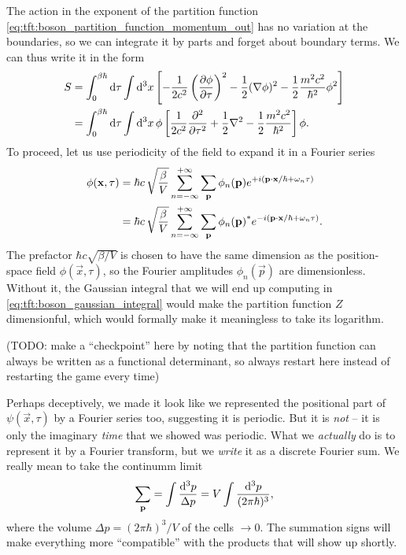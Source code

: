 The action in the exponent of the partition function \eqref{eq:tft:boson_partition_function_momentum_out} has no variation at the boundaries, so we can integrate it by parts and forget about boundary terms.
We can thus write it in the form
\begin{equation}
\begin{split}
	S & = \int_0^{\beta \hbar} \mathop{}\!\mathrm{d} \tau \int \mathop{}\!\mathrm{d}^3 x \left[ - \frac{1}{2c^2} \pdv{\phi}{\tau}^2 - \frac12 (\nabla \phi)^2 - \frac12 \frac{m^2 c^2}{\hbar^2} \phi^2 \right] \\
	  & = \int_0^{\beta \hbar} \mathop{}\!\mathrm{d} \tau \int \mathop{}\!\mathrm{d}^3 x \, \phi \left[ \frac{1}{2c^2} \pdv[2]{}{\tau} + \frac12 \nabla^2 - \frac12 \frac{m^2 c^2}{\hbar^2} \right] \phi .
\end{split}
\end{equation}
To proceed, let us use periodicity of the field to expand it in a Fourier series
\begin{equation}
\begin{split}
	\phi(\mathbf{x}, \tau) & = \hbar c \, \sqrt{\frac{\beta}{V}} \sum_{n=-\infty}^{+\infty} \sum_{\mathbf{p}}       \phi_n(\mathbf{p})  e^{+i (\mathbf{p} \cdot \mathbf{x} / \hbar + \omega_n \tau)} \\
	                    & = \hbar c \, \sqrt{\frac{\beta}{V}} \sum_{n=-\infty}^{+\infty} \sum_{\mathbf{p}} {\phi_n(\mathbf{p})}^* e^{-i (\mathbf{p} \cdot \mathbf{x} / \hbar + \omega_n \tau)} .
\end{split}
\end{equation}
The prefactor $\hbar c \sqrt{\beta/V}$ is chosen to have the same dimension as the position-space field $\phi(\vec{x}, \tau)$, so the Fourier amplitudes $\phi_n(\vec{p})$ are dimensionless.
Without it, the Gaussian integral that we will end up computing in \cref{eq:tft:boson_gaussian_integral} would make the partition function $Z$ dimensionful, which would formally make it meaningless to take its logarithm.

(TODO: make a ``checkpoint'' here by noting that the partition function can always be written as a functional determinant, so always restart here instead of restarting the game every time)

Perhaps deceptively, we made it look like we represented the positional part of $\psi(\vec{x}, \tau)$ by a Fourier series too, suggesting it is periodic.
But it is \emph{not} -- it is only the imaginary \emph{time} that we showed was periodic.
What we \emph{actually} do is to represent it by a Fourier transform, but we \emph{write} it as a discrete Fourier sum.
We really mean to take the continumm limit
\begin{equation}
	\sum_{\mathbf{p}} = \int \frac{\mathop{}\!\mathrm{d}^3 p}{\Delta p} = V \int \frac{\mathop{}\!\mathrm{d}^3 p}{(2 \pi \hbar)^3} ,
\end{equation}
where the volume $\Delta p = (2 \pi \hbar)^3 / V$ of the cells $\rightarrow 0$.
The summation signs will make everything more ``compatible'' with the products that will show up shortly.

